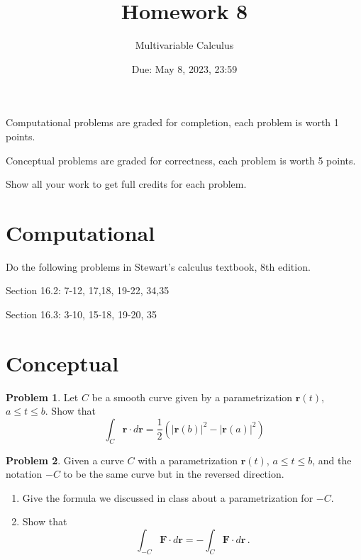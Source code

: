\documentclass[12pt]{article}
\title{Homework 8}
\author{ Multivariable Calculus}
\date{Due: May 8, 2023, 23:59}
\newcommand{\vect}{\mathbf}
\theoremstyle{definition}
\newtheorem{problem}{Problem}
\begin{document}
\maketitle

Computational problems are graded for completion, each problem is worth 1 points.

Conceptual problems are graded for correctness, each problem is worth 5 points.

Show all your work to get full credits for each problem.

\section{Computational}
Do the following problems in Stewart's calculus textbook, 8th edition.

Section 16.2: 7-12, 17,18, 19-22, 34,35

Section 16.3: 3-10, 15-18, 19-20, 35

\section{Conceptual}

\begin{problem}
    Let $C$ be a smooth curve given by a parametrization $\vect{r}(t)$, $a\leq t \leq b$.
    Show that
    \begin{equation*}
        \int_C \vect{r}\cdot d\vect{r} = \frac{1}{2} \left(|\vect{r}(b)|^2 - |\vect{r}(a)|^2\right)
    \end{equation*}
\end{problem}

\begin{problem}
    Given a curve $C$ with a parametrization $\vect{r}(t)$, $a\leq t \leq b$, 
    and the notation $-C$ to be the same curve but in the reversed direction.
    \begin{enumerate}
        \item Give the formula we discussed in class about a parametrization for $-C$.
        \item Show that
            \begin{equation*}
                \int_{-C} \vect{F}\cdot d\vect{r} = 
                - \int_C \vect{F}\cdot d\vect{r} \,.
            \end{equation*}
    \end{enumerate}
\end{problem}




%
\end{document}
